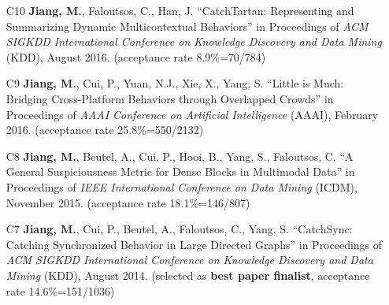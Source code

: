 \documentclass[10pt]{article}
\newenvironment{myindentpar}[1]%
{\begin{list}{}%
         {\setlength{\leftmargin}{#1}}%
         \item[]%
}
{\end{list}}
\newcounter{list}
\newcommand{\hide}[1]{}
\begin{document}
\begin{myindentpar}{0.00cm}
\begin{enumerate}[leftmargin=.5cm]
	\hide{\vspace{-0.1cm}\hspace{0.5cm}{\small \emph{Ms. Gui conceived the idea in consultation with myself. Ms. Gui, her colleague Dr. Liu, and I implemented the system and completed the experiments. Ms. Gui wrote the paper. I edited the paper.}}}

\item[C10] \textbf{Jiang, M.}, Faloutsos, C., Han, J. ``CatchTartan: Representing and Summarizing Dynamic Multicontextual Behaviors'' in Proceedings of \emph{ACM SIGKDD International Conference on Knowledge Discovery and Data Mining} (KDD), August 2016. (acceptance rate 8.9\%=70/784)

	\hide{\vspace{-0.1cm}\hspace{0.5cm}{\small \emph{I conceived the idea, designed the study, did the experiments, and wrote the paper.}}}

\item[C9] \textbf{Jiang, M.}, Cui, P., Yuan, N.J., Xie, X., Yang, S. ``Little is Much: Bridging Cross-Platform Behaviors through Overlapped Crowds'' in Proceedings of \emph{AAAI Conference on Artificial Intelligence} (AAAI), February 2016. (acceptance rate 25.8\%=550/2132)

	\hide{\vspace{-0.1cm}\hspace{0.5cm}{\small \emph{I conceived the idea in consultation with Dr. Cui. I designed the study, completed the experiments, and wrote the paper.}}}

\item[C8] \textbf{Jiang, M.}, Beutel, A., Cui, P., Hooi, B., Yang, S., Faloutsos, C. ``A General Suspiciousness Metric for Dense Blocks in Multimodal Data'' in Proceedings of \emph{IEEE International Conference on Data Mining} (ICDM), November 2015. (acceptance rate 18.1\%=146/807)

	\hide{\vspace{-0.1cm}\hspace{0.5cm}{\small \emph{I conceived the idea in consultation with Dr. Beutel. I designed the study, completed the experiments, and wrote the paper. Dr. Beutel edited the paper.}}}

\item[C7] \textbf{Jiang, M.}, Cui, P., Beutel, A., Faloutsos, C., Yang, S. ``CatchSync: Catching Synchronized Behavior in Large Directed Graphs'' in Proceedings of \emph{ACM SIGKDD International Conference on Knowledge Discovery and Data Mining} (KDD), August 2014. (selected as \textbf{best paper finalist}, acceptance rate 14.6\%=151/1036)


\end{enumerate}
\end{myindentpar}
\end{document}
